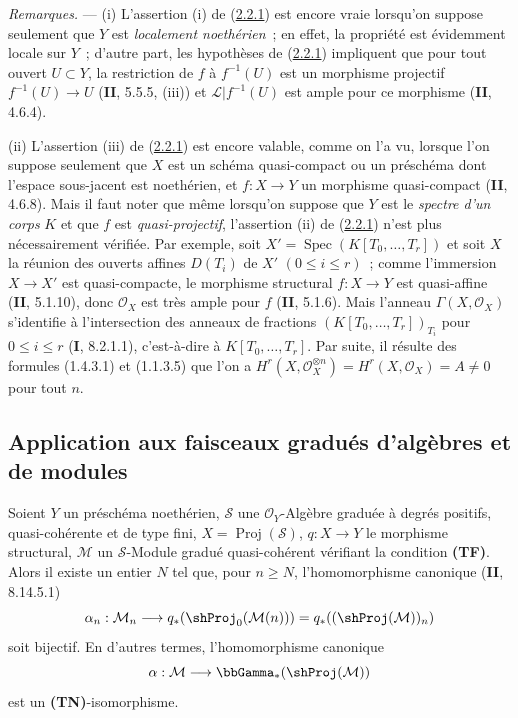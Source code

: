 \begin{env}[2.2.5]
\label{III.2.2.5-fr}
\emph{Remarques.} ---
(i) L'assertion (i) de (\hyperref[III.2.2.1-fr]{2.2.1}) est encore vraie
lorsqu'on suppose seulement que $Y$ est \emph{localement noethérien}~; en
effet, la propriété est évidemment locale sur $Y$~; d'autre part, les
hypothèses de (\hyperref[III.2.2.1-fr]{2.2.1}) impliquent que pour tout
ouvert $U\subset Y$, la restriction de $f$ à $f^{-1}(U)$ est un morphisme
projectif $f^{-1}(U)\to U$ (\textbf{II}, 5.5.5, (iii)) et
$\mathcal L|f^{-1}(U)$ est ample pour ce morphisme (\textbf{II}, 4.6.4).

(ii) L'assertion (iii) de (\hyperref[III.2.2.1-fr]{2.2.1}) est encore
valable, comme on l'a vu, lorsque l'on suppose seulement que $X$ est un
schéma quasi-compact ou un préschéma dont l'espace sous-jacent est
noethérien, et $f:X\to Y$ un morphisme quasi-compact (\textbf{II}, 4.6.8). Mais il
faut noter que même lorsqu'on suppose que $Y$ est le \emph{spectre d'un
corps} $K$ et que $f$ est \emph{quasi-projectif}, l'assertion (ii) de
(\hyperref[III.2.2.1-fr]{2.2.1}) n'est plus nécessairement vérifiée. Par
exemple, soit $X'=\operatorname{Spec}(K[T_0,\ldots,T_r])$ et soit $X$ la
réunion des ouverts affines $D(T_i)$ de $X'$ $(0\leq i\leq r)$~; comme
l'immersion $X\to X'$ est quasi-compacte, le morphisme structural
$f:X\to Y$ est quasi-affine (\textbf{II}, 5.1.10), donc $\mathcal O_X$ est très
ample pour $f$ (\textbf{II}, 5.1.6). Mais l'anneau
$\Gamma(X,\mathcal O_X)$ s'identifie à l'intersection des anneaux de
fractions $(K[T_0,\ldots,T_r])_{T_i}$ pour $0\leq i\leq r$
(\textbf{I}, 8.2.1.1), c'est-à-dire à $K[T_0,\ldots,T_r]$. Par suite, il résulte
des formules (1.4.3.1) et (1.1.3.5) que l'on a
$H^r(X,\mathcal O_X^{\otimes n})=H^r(X,\mathcal O_X)=A\neq0$ pour tout
$n$.
\end{env}

\subsection{Application aux faisceaux gradués d'algèbres et de modules}
\label{subsection:III.2.3-fr}

\begin{theorem}[2.3.1]
\label{III.2.3.1-fr}
Soient $Y$ un préschéma noethérien, $\mathcal S$ une
$\mathcal O_Y$-Algèbre graduée à degrés positifs, quasi-cohérente et de
type fini, $X=\operatorname{Proj}(\mathcal S)$,
$q:X\to Y$ le morphisme structural, $\mathcal M$ un $\mathcal S$-Module
gradué quasi-cohérent vérifiant la condition \textup{\textbf{(TF)}}. Alors il existe
un entier $N$ tel que, pour $n\geq N$, l'homomorphisme canonique
\textup{(\textbf{II}, 8.14.5.1)}
\[
\alpha_n:\mathcal M_n\longrightarrow
q_*(\shProj_0(\mathcal M(n)))
=q_*((\shProj(\mathcal M))_n)
\]
soit bijectif. En d'autres termes, l'homomorphisme canonique
\[
\alpha:\mathcal M\longrightarrow\bbGamma_*(\shProj(\mathcal M))
\]
est un \textup{\textbf{(TN)}}-isomorphisme.
\end{theorem}

